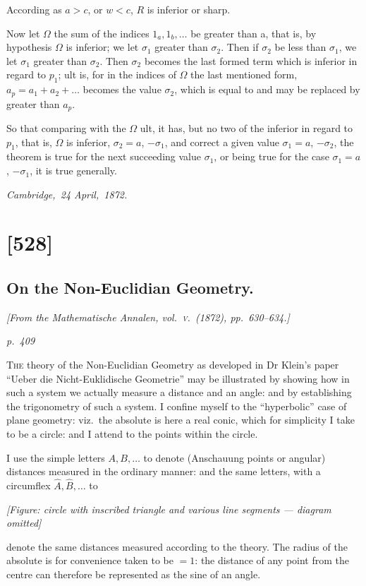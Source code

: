 \documentclass[11pt,a4paper]{article}
\theoremstyle{plain}
\theoremstyle{definition}
\begin{document}
According as $a > c$, or $w < c$, $R$ is inferior or sharp.

Now let $\Omega$ the sum of the indices $1_a, 1_b, \ldots$ be greater than a, that is, by hypothesis
$\Omega$ is inferior; we let $\sigma_1$ greater than $\sigma_2$.  Then if $\sigma_2$ be less than $\sigma_1$, we let $\sigma_1$
greater than $\sigma_2$.  Then $\sigma_2$ becomes the last formed term which is inferior in
regard to $p_1$; ult is, for in the indices of $\Omega$ the last mentioned form, $a_p = a_1 + a_2 + \ldots$
becomes the value $\sigma_2$, which is equal to and may be replaced by greater than $a_p$.

So that comparing with the $\Omega$ ult, it has, but no two of the inferior in regard to $p_1$,
that is, $\Omega$ is inferior, $\sigma_2 = a$, $-\sigma_1$, and correct a given value $\sigma_1 = a$, $-\sigma_2$, the theorem is true
for the next succeeding value $\sigma_1$, or being true for the case $\sigma_1 = a$, $-\sigma_1$, it is true
generally.

\noindent\textit{Cambridge,\ 24 April,\ 1872.}

\clearpage

\section{[528]}
\subsection{On the Non-Euclidian Geometry.}

\begin{center}
\textit{[From the Mathematische Annalen, vol.~\textsc{v}.\ (1872), pp.~630--634.]}
\end{center}

\textit{p.~409}

\noindent
\textsc{The} theory of the Non-Euclidian Geometry as developed in Dr Klein's paper
``Ueber die Nicht-Euklidische Geometrie'' may be illustrated by showing how in such
a system we actually measure a distance and an angle: and by establishing the
trigonometry of such a system.  I confine myself to the ``hyperbolic'' case of plane
geometry: viz.\ the absolute is here a real conic, which for simplicity I take to be a
circle: and I attend to the points within the circle.

I use the simple letters $A, B, \ldots$ to denote (Anschauung points or angular) distances measured
in the ordinary manner: and the same letters, with a circumflex $\hat{A}, \hat{B}, \ldots$ to
\begin{center}
\textit{[Figure: circle with inscribed triangle and various line segments --- diagram omitted]}
\end{center}
denote the same distances measured according to the theory.  The radius of the
absolute is for convenience taken to be $= 1$: the distance of any point from the centre
can therefore be represented as the sine of an angle.
\end{document}
